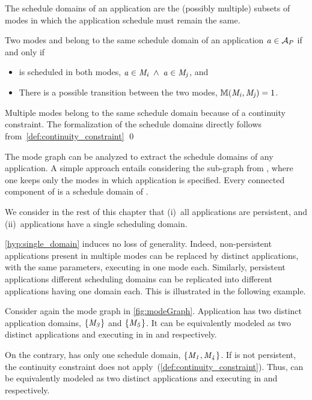 \begin{definition}
\label{def:sched_domains}
The schedule domains of an application are the (possibly multiple) subsets of modes in which the application schedule must remain the same.
\end{definition}

\begin{corollary}
	Two modes \modei and \modej belong to the same schedule domain of an application $\mathit{a_{}} \in \mathcal{A}_{P}$ if and only if
	\begin{itemize}
		\item \app is scheduled in both modes, \ie $\mathit{a_{}} \in \mathit{M_{i}} \; \wedge \; \mathit{a_{}} \in \mathit{M_{j}}$, and
		\item There is a possible transition between the two modes, \ie $\mathbb{M}(\mathit{M_{i}}, \mathit{M_{j}}) = 1$.
	\end{itemize}
\end{corollary}

\proof
Multiple modes belong to the same schedule domain because of a continuity constraint.
The formalization of the schedule domains directly follows from~\cref{def:continuity_constraint}
\qed

The mode graph can be analyzed to extract the schedule domains of any application.
A simple approach entails considering the sub-graph \modeGraphA from \modeGraph, \ie where one keeps only the modes in which application \app is specified.
Every connected component of \modeGraphA is a schedule domain of \app.

\begin{hypothesis}
	\label{hyp:single_domain}
	We consider in the rest of this chapter that (i)~all applications are persistent, and (ii)~applications have a single scheduling domain.
\end{hypothesis}

\cref{hyp:single_domain} induces no loss of generality. Indeed, non-persistent applications present in multiple modes can be replaced by distinct applications, with the same parameters, executing in one mode each.
Similarly, persistent applications different scheduling domains can be replicated into different applications having one domain each.
This is illustrated in the following example.

\begin{example}\label{exp:sched_domain}
Consider again the mode graph in \cref{fig:modeGraph}. Application  has two distinct application domains, $\{\mathit{M_{3}}\}$ and $\{\mathit{M_{5}}\}$. It can be equivalently modeled as two distinct applications  and  executing in in  and  respectively.

On the contrary,  has only one schedule domain, $\{\mathit{M_{1}},\mathit{M_{4}}\}$.
If  is not persistent, the continuity constraint does not apply~(\cref{def:continuity_constraint}).
Thus,  can be equivalently modeled as two distinct applications  and  executing in  and  respectively.
\end{example}


